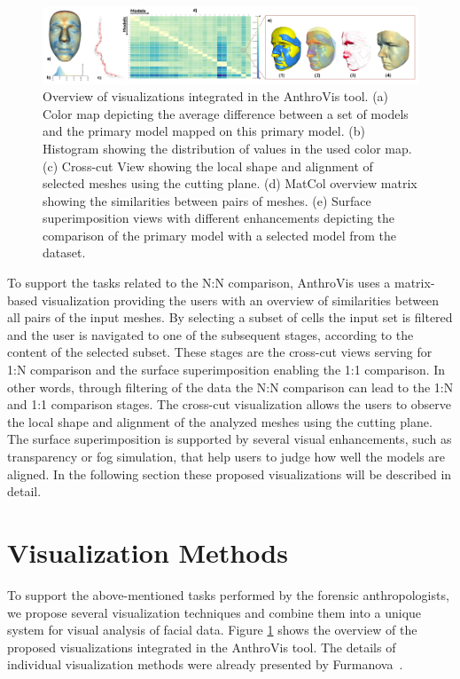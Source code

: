 \documentclass[final,5p,times]{elsarticle}
\begin{document}
\begin{figure}[htb]
	\centering
  \includegraphics[width=1.0\linewidth]{pictures/overview4.png}
  \caption{\label{fig:overview}Overview of visualizations integrated in the AnthroVis tool. (a) Color map depicting the average difference between a set of models and the primary model mapped on this primary model. (b) Histogram showing the distribution of values in the used color map. (c) Cross-cut View showing the local shape and alignment of selected meshes using the cutting plane. (d) MatCol overview matrix showing the similarities between pairs of meshes. (e) Surface superimposition views with different enhancements depicting the comparison of the primary model with a selected model from the dataset.}
\end{figure}

To support the tasks related to the N:N comparison, AnthroVis uses a matrix-based visualization providing the users with an overview of similarities between all pairs of the input meshes.
By selecting a subset of cells the input set is filtered and the user is navigated to one of the subsequent stages, according to the content of the selected subset.
These stages are the cross-cut views serving for 1:N comparison and the surface superimposition enabling the 1:1 comparison.
In other words, through filtering of the data the N:N comparison can lead to the 1:N and 1:1 comparison stages.
The cross-cut visualization allows the users to observe the local shape and alignment of the analyzed meshes using the cutting plane.
The surface superimposition is supported by several visual enhancements, such as transparency or fog simulation, that help users to judge how well the models are aligned.
In the following section these proposed visualizations will be described in detail.

\section{Visualization Methods} \label{exface}
To support the above-mentioned tasks performed by the forensic anthropologists, we propose several visualization techniques and combine them into a unique system for visual analysis of facial data.
Figure \ref{fig:overview} shows the overview of the proposed visualizations integrated in the AnthroVis tool.
The details of individual visualization methods were already presented by Furmanova~\cite{Furmanova2015}.
\end{document}
